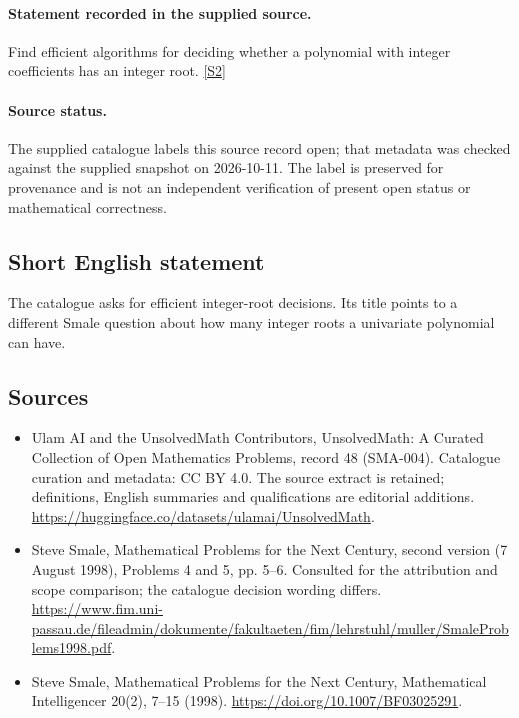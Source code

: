 \documentclass[11pt]{article}
\begin{document}
\paragraph{Statement recorded in the supplied source.}
Find efficient algorithms for deciding whether a polynomial with integer coefficients has an integer root. \href{https://www.fim.uni-passau.de/fileadmin/dokumente/fakultaeten/fim/lehrstuhl/muller/SmaleProblems1998.pdf}{[S2]}
\paragraph{Source status.}
The supplied catalogue labels this source record open; that metadata was checked against the supplied snapshot on 2026-10-11. The label is preserved for provenance and is not an independent verification of present open status or mathematical correctness.
\subsection{Short English statement}
The catalogue asks for efficient integer-root decisions. Its title points to a different Smale question about how many integer roots a univariate polynomial can have.
\subsection{Sources}
\begin{itemize}
\item[S1] Ulam AI and the UnsolvedMath Contributors, UnsolvedMath: A Curated Collection of Open Mathematics Problems, record 48 (SMA-004). Catalogue curation and metadata: CC BY 4.0. The source extract is retained; definitions, English summaries and qualifications are editorial additions.
\url{https://huggingface.co/datasets/ulamai/UnsolvedMath}.
\item[S2] Steve Smale, Mathematical Problems for the Next Century, second version (7 August 1998), Problems 4 and 5, pp. 5--6. Consulted for the attribution and scope comparison; the catalogue decision wording differs.
\url{https://www.fim.uni-passau.de/fileadmin/dokumente/fakultaeten/fim/lehrstuhl/muller/SmaleProblems1998.pdf}.
\item[S3] Steve Smale, Mathematical Problems for the Next Century, Mathematical Intelligencer 20(2), 7--15 (1998).
\url{https://doi.org/10.1007/BF03025291}.
\end{itemize}
\end{document}
